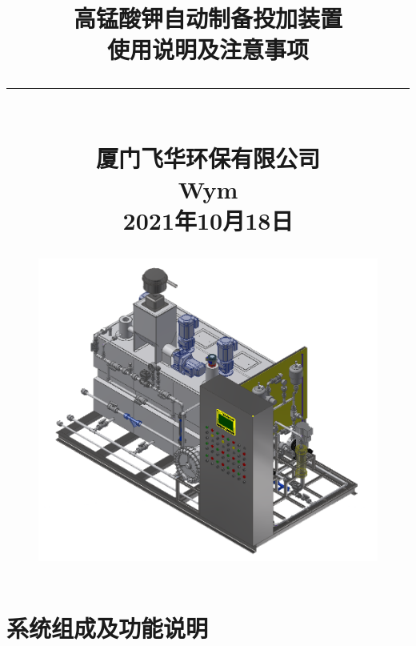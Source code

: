 \documentclass[UTF8,a4paper,12pt,titlepage]{ctexart}
\begin{document}
\title{
    高锰酸钾自动制备投加装置\\[2.5mm]
    使用说明及注意事项\\
   {\noindent}\rule{16cm}{1pt}\\[3mm]
    厦门飞华环保有限公司\\
    Wym\\
    2021年10月18日
   \begin{figure}[h]
      \centering
      \includegraphics[height=10cm]{g0.png}
   \end{figure}
}
\date{}

\maketitle %

\tableofcontents %

\newpage %

\section{系统组成及功能说明}
\end{document}
